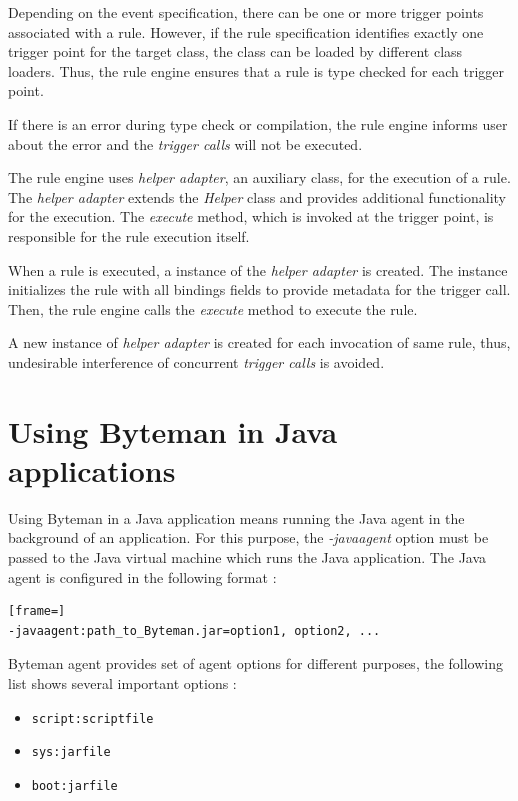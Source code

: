 \documentclass[12pt,oneside]{fithesis2}
\begin{document}
Depending on the event specification, there can be one or more trigger points associated with a rule. However, if the rule specification identifies exactly one trigger point for the target class, the class can be loaded by different class loaders. Thus, the rule engine ensures that a rule is type checked for each trigger point.

If there is an error during type check or compilation, the rule engine informs user about the error and the \textit{trigger calls} will not be executed.

The rule engine uses \textit{helper adapter}, an auxiliary class, for the execution of a rule. The \textit{helper adapter} extends the \textit{Helper} class and provides additional functionality for the execution. The \textit{execute} method, which is invoked at the trigger point, is responsible for the rule execution itself.

When a rule is executed, a instance of the \textit{helper adapter} is created. The instance initializes the rule with all bindings fields to provide metadata for the trigger call. Then, the rule engine calls the \textit{execute} method to execute the rule.

A new instance of \textit{helper adapter} is created for each invocation of same rule, thus, undesirable interference of concurrent \textit{trigger calls} is avoided.

\section{Using Byteman in Java applications}
Using Byteman in a Java application means running the Java agent in the background of an application. For this purpose, the \textit{-javaagent} option must be passed to the Java virtual machine which runs the Java application. The Java agent is configured in the following format \cite[Running Applications with Byteman]{byteman_doc}:
\begin{lstlisting}[frame=]
-javaagent:path_to_Byteman.jar=option1, option2, ...
\end{lstlisting}
Byteman agent provides set of agent options for different purposes, the following list shows several important options \cite[Available -javaagent Options]{byteman_doc}:

\begin{itemize}
	\item	\verb|script:scriptfile|
	\item	\verb|sys:jarfile|
	\item	\verb|boot:jarfile|
\end{itemize}
\end{document}
